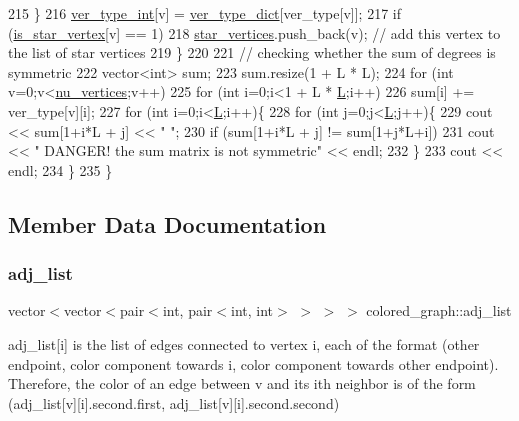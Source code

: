 \begin{DoxyCode}
215     \}
216     \hyperlink{classcolored__graph_a491ed2ea1a65118af02ec606c8d44c0a}{ver\_type\_int}[v] = \hyperlink{classcolored__graph_aeb780762429ddac375799f4a45405712}{ver\_type\_dict}[ver\_type[v]];
217     \textcolor{keywordflow}{if} (\hyperlink{classcolored__graph_a00d0c64fcf8de58553aa4cade64193df}{is\_star\_vertex}[v] == 1)
218       \hyperlink{classcolored__graph_ab7ee8d717abde7ad7467ef695038f574}{star\_vertices}.push\_back(v); \textcolor{comment}{// add this vertex to the list of star vertices }
219   \}
220 
221   \textcolor{comment}{// checking whether the sum of degrees is symmetric}
222   vector<int> sum;
223   sum.resize(1 + L * L);
224   \textcolor{keywordflow}{for} (\textcolor{keywordtype}{int} v=0;v<\hyperlink{classcolored__graph_a90ece8eb1fec52f3f41549ab527c1d5b}{nu\_vertices};v++)
225     \textcolor{keywordflow}{for} (\textcolor{keywordtype}{int} i=0;i<1 + L * \hyperlink{classcolored__graph_ae159d1b15106b70a2eabef8884501e97}{L};i++)
226       sum[i] += ver\_type[v][i];
227   \textcolor{keywordflow}{for} (\textcolor{keywordtype}{int} i=0;i<\hyperlink{classcolored__graph_ae159d1b15106b70a2eabef8884501e97}{L};i++)\{
228     \textcolor{keywordflow}{for} (\textcolor{keywordtype}{int} j=0;j<\hyperlink{classcolored__graph_ae159d1b15106b70a2eabef8884501e97}{L};j++)\{
229       cout << sum[1+i*L + j] << \textcolor{stringliteral}{" "};
230       \textcolor{keywordflow}{if} (sum[1+i*L + j] != sum[1+j*L+i])
231         cout << \textcolor{stringliteral}{" DANGER! the sum matrix is not symmetric"} << endl;
232     \}
233     cout << endl;
234   \}
235 \}
\end{DoxyCode}


\subsection{Member Data Documentation}
\mbox{\label{classcolored__graph_a45dce16965079286cf3f41a54a1b2ea4}} 
\subsubsection{\texorpdfstring{adj\+\_\+list}{adj\_list}}
{\footnotesize\ttfamily vector$<$vector$<$pair$<$int, pair$<$int, int$>$ $>$ $>$ $>$ colored\+\_\+graph\+::adj\+\_\+list}



adj\+\_\+list\mbox{[}i\mbox{]} is the list of edges connected to vertex i, each of the format (other endpoint, color component towards i, color component towards other endpoint). Therefore, the color of an edge between v and its ith neighbor is of the form (adj\+\_\+list\mbox{[}v\mbox{]}\mbox{[}i\mbox{]}.second.\+first, adj\+\_\+list\mbox{[}v\mbox{]}\mbox{[}i\mbox{]}.second.\+second) 

